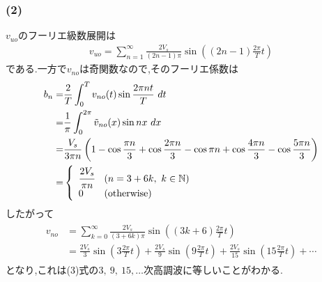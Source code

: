 \documentclass[uplatex,a4j,11pt,dvipdfmx]{jsarticle}
\begin{document}
\subsubsection*{(2)}
$v_{uo}$のフーリエ級数展開は
\begin{align}
  v_{uo}=\sum_{n=1}^{\infty}\frac{2V_s}{(2n-1)\pi}\sin\left((2n-1)\frac{2\pi}{T}t\right)
\end{align}
である.一方で$v_{no}$は奇関数なので,そのフーリエ係数は
\begin{align}
  \begin{split}
    b_n=&\frac{2}{T}\int_0^Tv_{no}(t)\sin\frac{2\pi nt}{T}\ dt\\
    =&\frac{1}{\pi}\int_0^{2\pi}\tilde{v}_{no}(x)\sin nx\ dx\\
    =&\frac{V_s}{3\pi n}\left(1-\cos\frac{\pi n}{3}+\cos\frac{2\pi n}{3}-\cos\pi n+\cos\frac{4\pi n}{3}-\cos\frac{5\pi n}{3}\right)\\
    =&\left\{
      \begin{array}{ll}
        \cfrac{2V_s}{\pi n}&(n=3+6k,\ k\in\mathbb{N})\\
        0&({\rm otherwise})
      \end{array}
    \right.
  \end{split}
\end{align}
したがって
\begin{align}
  \begin{split}
    v_{no}&=\sum_{k=0}^\infty\frac{2V_s}{(3+6k)\pi}\sin\left((3k+6)\frac{2\pi}{T}t\right)\\
    &=\frac{2V_s}{3}\sin\left(3\frac{2\pi}{T}t\right)
    +\frac{2V_s}{9}\sin\left(9\frac{2\pi}{T}t\right)
    +\frac{2V_s}{15}\sin\left(15\frac{2\pi}{T}t\right)+\cdots
  \end{split}
\end{align}
となり,これは(3)式の$3,\ 9,\ 15,\ldots$次高調波に等しいことがわかる.
\end{document}
